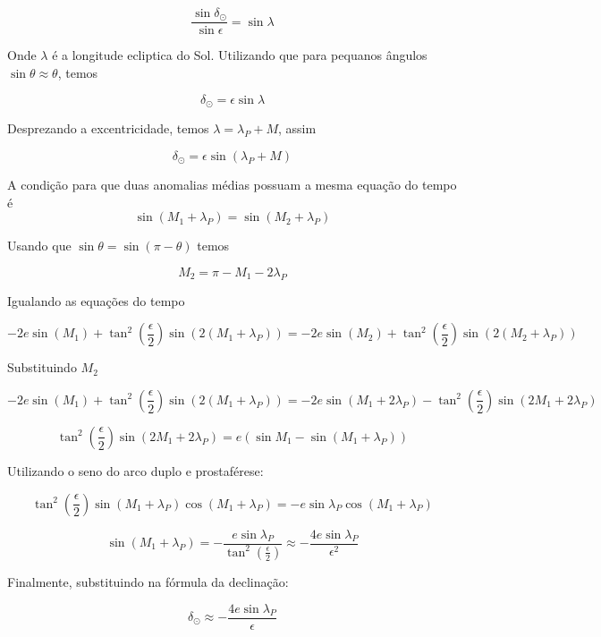 \documentclass[11pt]{article}
\begin{document}
\begin{pproblem}
\begin{pssolution*}{}{}
\begin{alternativas}
            \[\frac{\sin\delta_\odot}{\sin\epsilon} = \sin\lambda\]

            Onde \(\lambda \) é a longitude ecliptica do Sol. Utilizando que para pequanos ângulos \(\sin\theta \approx \theta\), temos

            \[\delta_\odot = \epsilon\sin\lambda\]

            Desprezando a excentricidade, temos \(\lambda = \lambda_P + M\), assim

            \[\boxed{\delta_\odot = \epsilon\sin(\lambda_P + M)}\]

            \item A condição para que duas anomalias médias possuam a mesma equação do tempo é 
            \[\sin(M_1+\lambda_P) = \sin(M_2+\lambda_P)\]

            Usando que \(\sin\theta = \sin(\pi-\theta)\) temos

            \[\boxed{M_2 =\pi -M_1-2\lambda_P}\]

            \item Igualando as equações do tempo
            
            \[-2e\sin(M_1) + \tan^2 \left( \frac{\epsilon}{2} \right)\sin\left(2(M_1 + \lambda_P) \right) = -2e\sin(M_2) + \tan^2 \left( \frac{\epsilon}{2} \right)\sin\left(2(M_2 + \lambda_P) \right)\]

            Substituindo \(M_2\)  

            \[-2e\sin(M_1) + \tan^2 \left( \frac{\epsilon}{2} \right)\sin\left(2(M_1 + \lambda_P) \right) = -2e\sin(M_1+2\lambda_P) - \tan^2 \left( \frac{\epsilon}{2} \right)\sin\left(2M_1 + 2\lambda_P \right)\]

            \[\tan^2 \left( \frac{\epsilon}{2} \right)\sin(2M_1+2\lambda_P) = e(\sin M_1 - \sin(M_1+\lambda_P))\]

            Utilizando o seno do arco duplo e prostaférese:

            \[\tan^2\left(\frac{\epsilon}{2}\right)\sin(M_1+\lambda_P)\cos(M_1+\lambda_P) = -e\sin\lambda_P\cos(M_1+\lambda_P)\]

            \[\sin(M_1+\lambda_P) = -\frac{e\sin\lambda_P}{\tan^2\left(\frac{\epsilon}{2}\right)}\approx -\frac{4e\sin\lambda_P}{\epsilon^2}\]

            Finalmente, substituindo na fórmula da declinação:

            \[\boxed{\delta_\odot \approx -\frac{4e\sin\lambda_P}{\epsilon}}\]
        \end{alternativas}
    \end{pssolution*}
    \end{pproblem}
\end{document}
